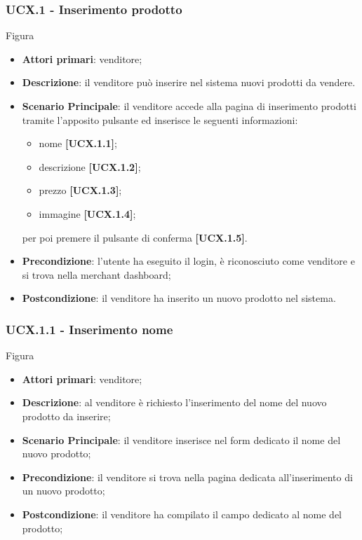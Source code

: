 \subsubsection{UCX.1 - Inserimento prodotto}
Figura \\
\begin{itemize}
\item \textbf{Attori primari}: venditore;
\item \textbf{Descrizione}: il venditore può inserire nel sistema nuovi prodotti da vendere.
\item \textbf{Scenario Principale}: il venditore accede alla pagina di inserimento prodotti tramite l'apposito pulsante ed inserisce le seguenti informazioni:
\begin{itemize}
	\item nome \textbf{[UCX.1.1]};
	\item descrizione \textbf{[UCX.1.2]};
	\item prezzo \textbf{[UCX.1.3]};
	\item immagine \textbf{[UCX.1.4]};
\end{itemize}
per poi premere il pulsante di conferma \textbf{[UCX.1.5]}.
\item \textbf{Precondizione}: l'utente ha eseguito il login, è riconosciuto come venditore e si trova nella merchant dashboard;
\item \textbf{Postcondizione}: il venditore ha inserito un nuovo prodotto nel sistema.
\end{itemize}

\subsubsection{UCX.1.1 - Inserimento nome}
Figura \\
\begin{itemize}
\item \textbf{Attori primari}: venditore;
\item \textbf{Descrizione}: al venditore è richiesto l'inserimento del nome del nuovo prodotto da inserire;
\item \textbf{Scenario Principale}: il venditore inserisce nel form dedicato il nome del nuovo prodotto;
\item \textbf{Precondizione}: il venditore si trova nella pagina dedicata all'inserimento di un nuovo prodotto;
\item \textbf{Postcondizione}: il venditore ha compilato il campo dedicato al nome del prodotto;
\end{itemize}

